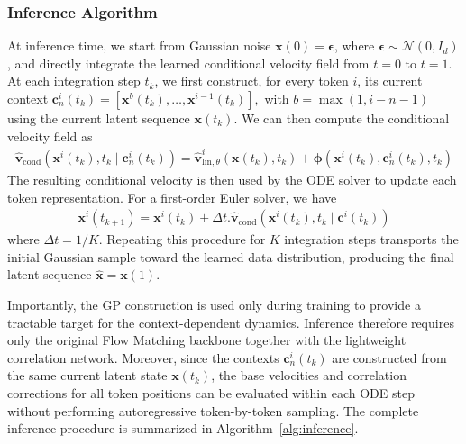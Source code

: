 \documentclass{article} %
\begin{document}
\subsubsection{Inference Algorithm}
At inference time, we start from Gaussian noise $\mathbf{x}(0)=\boldsymbol{\epsilon}$, where $\boldsymbol{\epsilon} \sim \mathcal{N}(0, I_{d})$, and directly integrate the learned conditional velocity field from $t=0$ to $t=1$. At each integration step $t_k$, we first construct, for every token $i$, its current context $\mathbf{c}^{i}_{n}(t_k)=[\mathbf{x}^{b}(t_k),\ldots,\mathbf{x}^{i-1}(t_k)],$ with $b=\max(1,i-n-1)$ using the current latent sequence $\mathbf{x}(t_k)$. We can then compute the conditional velocity field as 
\begin{eqnarray}
    \hat{\mathbf{v}}_{\text{cond}} (\mathbf{x}^i(t_k),t_k  \mid \mathbf{c}_n^{i}(t_k)) = \hat{\mathbf{v}}^{i}_{\text{lin},\theta} (\mathbf{x}(t_k), t_k) + \boldsymbol{\phi}(\mathbf{x}^i(t_k), \mathbf{c}_n^i(t_k) ,t_k) 
\end{eqnarray}
The resulting conditional velocity is then used by the ODE solver to update each token representation. For a first-order Euler solver, we have 
\begin{eqnarray}
        \mathbf{x}^{i}(t_{k+1}) = \mathbf{x}^{i}(t_k) + \Delta t . \hat{\mathbf{v}}_{\text{cond}} (\mathbf{x}^i(t_k),t_k  \mid \mathbf{c}^{i}(t_k)) 
\end{eqnarray}
where $\Delta t=1/K$. Repeating this procedure for $K$ integration steps transports the initial Gaussian sample toward the learned data distribution, producing the final latent sequence $\hat{\mathbf{x}}=\mathbf{x}(1)$.

Importantly, the GP construction is used only during training to provide a tractable target for the context-dependent dynamics. Inference therefore requires only the original Flow Matching backbone together with the lightweight correlation network. Moreover, since the contexts ${\mathbf{c}^{i}_{n}(t_k)}$ are constructed from the same current latent state $\mathbf{x}(t_k)$, the base velocities and correlation corrections for all token positions can be evaluated within each ODE step without performing autoregressive token-by-token sampling. The complete inference procedure is summarized in Algorithm~\ref{alg:inference}.
\end{document}
